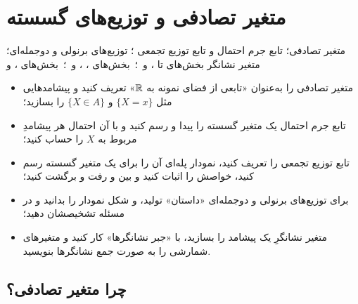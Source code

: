 \chapter{متغیر تصادفی و توزیع‌های گسسته}
\label{ch:s5}

\providecommand{\stems}[2]{%
  \edef\stemlist{#2}%
  \foreach \k/\p in \stemlist {
    \draw[#1, line width=1.5pt] (\k,0) -- (\k,\p);
    \fill[#1] (\k,\p) circle (1.7pt);
  }}

{متغیر تصادفی؛ تابع جرم احتمال  و تابع توزیع تجمعی ؛ توزیع‌های برنولی و دوجمله‌ای؛ متغیر نشانگر}
{ بخش‌های  تا ،  و  \,؛\,  بخش‌های ، ،  و  \,؛\,  بخش‌های ،  و }
{\begin{itemize}
  \item متغیر تصادفی را به‌عنوان «تابعی از فضای نمونه به $\mathbb{R}$» تعریف کنید و پیشامدهایی مثل $\{X=x\}$ و $\{X\in A\}$ را بسازید؛
  \item تابع جرم احتمال یک متغیر گسسته را پیدا و رسم کنید و با آن احتمال هر پیشامدِ مربوط به $X$ را حساب کنید؛
  \item تابع توزیع تجمعی را تعریف کنید، نمودار پله‌ای آن را برای یک متغیر گسسته رسم کنید، خواصش را اثبات کنید و بین  و  رفت و برگشت کنید؛
  \item برای توزیع‌های برنولی و دوجمله‌ای «داستان» تولید،  و شکل نمودار را بدانید و در مسئله تشخیصشان دهید؛
  \item متغیر نشانگرِ یک پیشامد را بسازید، با «جبر نشانگرها» کار کنید و متغیرهای شمارشی را به صورت جمع نشانگرها بنویسید.
\end{itemize}}

\section{چرا متغیر تصادفی؟}


